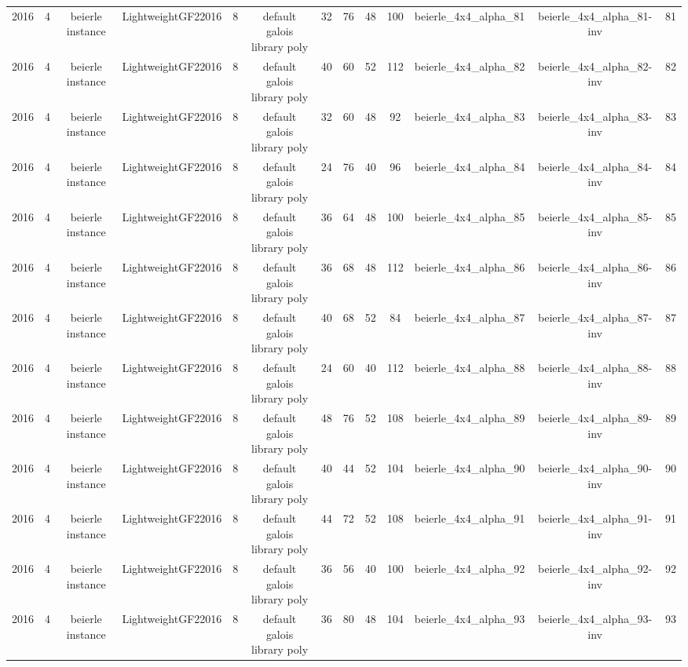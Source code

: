 \begin{tabular}{c c c c c c c c c c c c c}
2016 & 4 & beierle instance & LightweightGF22016 & 8 & default galois library poly & 32 & 76 & 48 & 100 & beierle_4x4_alpha_81 & beierle_4x4_alpha_81-inv & 81 \\
2016 & 4 & beierle instance & LightweightGF22016 & 8 & default galois library poly & 40 & 60 & 52 & 112 & beierle_4x4_alpha_82 & beierle_4x4_alpha_82-inv & 82 \\
2016 & 4 & beierle instance & LightweightGF22016 & 8 & default galois library poly & 32 & 60 & 48 & 92 & beierle_4x4_alpha_83 & beierle_4x4_alpha_83-inv & 83 \\
2016 & 4 & beierle instance & LightweightGF22016 & 8 & default galois library poly & 24 & 76 & 40 & 96 & beierle_4x4_alpha_84 & beierle_4x4_alpha_84-inv & 84 \\
2016 & 4 & beierle instance & LightweightGF22016 & 8 & default galois library poly & 36 & 64 & 48 & 100 & beierle_4x4_alpha_85 & beierle_4x4_alpha_85-inv & 85 \\
2016 & 4 & beierle instance & LightweightGF22016 & 8 & default galois library poly & 36 & 68 & 48 & 112 & beierle_4x4_alpha_86 & beierle_4x4_alpha_86-inv & 86 \\
2016 & 4 & beierle instance & LightweightGF22016 & 8 & default galois library poly & 40 & 68 & 52 & 84 & beierle_4x4_alpha_87 & beierle_4x4_alpha_87-inv & 87 \\
2016 & 4 & beierle instance & LightweightGF22016 & 8 & default galois library poly & 24 & 60 & 40 & 112 & beierle_4x4_alpha_88 & beierle_4x4_alpha_88-inv & 88 \\
2016 & 4 & beierle instance & LightweightGF22016 & 8 & default galois library poly & 48 & 76 & 52 & 108 & beierle_4x4_alpha_89 & beierle_4x4_alpha_89-inv & 89 \\
2016 & 4 & beierle instance & LightweightGF22016 & 8 & default galois library poly & 40 & 44 & 52 & 104 & beierle_4x4_alpha_90 & beierle_4x4_alpha_90-inv & 90 \\
2016 & 4 & beierle instance & LightweightGF22016 & 8 & default galois library poly & 44 & 72 & 52 & 108 & beierle_4x4_alpha_91 & beierle_4x4_alpha_91-inv & 91 \\
2016 & 4 & beierle instance & LightweightGF22016 & 8 & default galois library poly & 36 & 56 & 40 & 100 & beierle_4x4_alpha_92 & beierle_4x4_alpha_92-inv & 92 \\
2016 & 4 & beierle instance & LightweightGF22016 & 8 & default galois library poly & 36 & 80 & 48 & 104 & beierle_4x4_alpha_93 & beierle_4x4_alpha_93-inv & 93 \\

\end{tabular}
